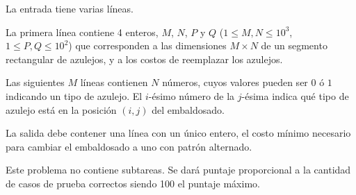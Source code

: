 \documentclass{oci}
\begin{document}
\begin{inputDescription}
La entrada tiene varias líneas.

La primera línea contiene 4 enteros, $M$, $N$, $P$ y $Q$ ($1 \le M, N \le 10^3$, $1 \le P, Q \le 10^2$) que corresponden a las dimensiones $M \times N$ de un segmento rectangular de azulejos, y a los costos de reemplazar los azulejos.

Las siguientes $M$ líneas contienen $N$ números, cuyos valores pueden ser $0$ ó
$1$ indicando un tipo de azulejo.
El $i$-ésimo número de la $j$-ésima indica qué tipo de azulejo está en la
posición $(i, j)$ del embaldosado.
\end{inputDescription}

\begin{outputDescription}
La salida debe contener una línea con un único entero, el costo mínimo necesario
para cambiar el embaldosado a uno con patrón alternado.
\end{outputDescription}

\begin{scoreDescription}
  Este problema no contiene subtareas.
  Se dará puntaje proporcional a la cantidad de casos de prueba correctos siendo
  100 el puntaje máximo.
\end{scoreDescription}

\begin{sampleDescription}
\end{sampleDescription}
\end{document}
